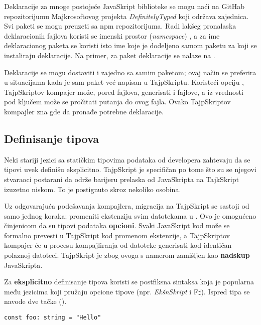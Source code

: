 Deklaracije za mnoge postojeće JavaSkript biblioteke se mogu naći na GitHab repozitorijumu Majkrosoftovog projekta \textsl{DefinitelyTyped} koji održava zajednica.
Svi paketi se mogu preuzeti sa npm repozitorijuma.
Radi lakšeg pronalaska deklaracionih fajlova koristi se imenski prostor (\textsl{namespace}) , a za ime deklaracionog paketa se koristi isto ime koje je dodeljeno samom paketu za koji se instaliraju deklaracije.
Na primer, za paket  deklaracije se nalaze na .

Deklaracije se mogu dostaviti i zajedno sa samim paketom; ovaj način se preferira u situacijama kada je sam paket već napisan u TajpSkriptu.
Koristeći opciju , TajpSkriptov kompajer može, pored  fajlova, generisati i  fajlove, a iz  vrednosti pod ključem  može se pročitati putanja do ovog fajla.
Ovako TajpSkriptov kompajler zna gde da pronađe potrebne deklaracije.

\subsection{Definisanje tipova}

Neki stariji jezici sa statičkim tipovima podataka od developera zahtevaju da se tipovi uvek definišu eksplicitno.
TajpSkript je specifičan po tome što su se njegovi stvaraoci postarani da održe barijeru prelaska od JavaSkripta na TajkSkript izuzetno niskom.
To je postignuto skroz nekoliko osobina.

Uz odgovarajuća podešavanja kompajlera, migracija na TajpSkript se sastoji od samo jednog koraka: promeniti ekstenziju svim  datotekama u .
Ovo je omogućeno činjenicom da su tipovi podataka \textbf{opcioni}.
Svaki JavaSkript kod može se formalno prevesti u TajpSkript kod promenom ekstenzije, a TajpSkriptov kompajer će u procesu kompajliranja od  datoteke generisati kod identičan polaznoj  datoteci.
TajpSkript je zbog ovoga s namerom zamišljen kao \textbf{nadskup} JavaSkripta.

Za \textbf{eksplicitno} definisanje tipova koristi se postfiksna sintaksa koja je popularna među jezicima koji pružaju opcione tipove (npr. \textsl{EkšnSkript} i F$\sharp$).
Ispred tipa se navode dve tačke (\code{:}).

\begin{verbatim}
const foo: string = "Hello"
\end{verbatim}

